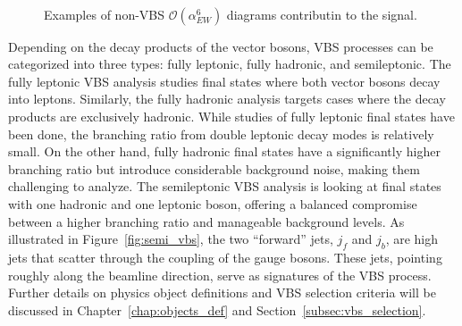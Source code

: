 \begin{figure}[tbp]
\begin{center}
\\
\caption{
Examples of non-VBS $\mathcal{O}(\alpha_{EW}^6)$ diagrams contributin to the signal.
}
\label{fig:feynmanEWKnonVBS}
\end{center}
\end{figure}

Depending on the decay products of the vector bosons, VBS processes can be categorized into three types: fully leptonic, fully hadronic, and semileptonic. 
The fully leptonic VBS analysis studies final states where both vector bosons decay into leptons. 
Similarly, the fully hadronic analysis targets cases where the decay products are exclusively hadronic.
While studies of fully leptonic final states have been done, the branching ratio from double leptonic decay modes is relatively small. On the other hand, fully hadronic final states have a significantly higher branching ratio but introduce considerable background noise, making them challenging to analyze.
The semileptonic VBS analysis is looking at final states with one hadronic and one leptonic boson, offering a balanced compromise between a higher branching ratio and manageable background levels. As illustrated in Figure~\ref{fig:semi_vbs}, the two ``forward'' jets, $j_{f}$ and $j_{b}$, are high \pt jets that scatter through the coupling of the gauge bosons. These jets, pointing roughly along the beamline direction, serve as signatures of the VBS process. Further details on physics object definitions and VBS selection criteria will be discussed in Chapter~\ref{chap:objects_def} and Section~\ref{subsec:vbs_selection}.

